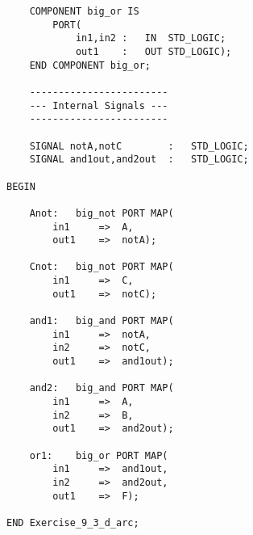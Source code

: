 \begin{enumerate}
\begin{lstlisting}
	COMPONENT big_or IS
		PORT(
			in1,in2	:	IN	STD_LOGIC;
			out1	:	OUT	STD_LOGIC);
	END COMPONENT big_or;
	
	------------------------
	--- Internal Signals ---
	------------------------
	
	SIGNAL notA,notC		:	STD_LOGIC;
	SIGNAL and1out,and2out	:	STD_LOGIC;
	
BEGIN
		
	Anot:	big_not PORT MAP(
		in1		=>	A,
		out1	=>	notA);
	
	Cnot:	big_not PORT MAP(
		in1		=>	C,
		out1	=>	notC);
		
	and1:	big_and PORT MAP(
		in1		=>	notA,
		in2		=>	notC,
		out1	=>	and1out);
		
	and2:	big_and PORT MAP(
		in1		=>	A,
		in2		=>	B,
		out1	=>	and2out);
		
	or1:	big_or PORT MAP(
		in1		=>	and1out,
		in2		=>	and2out,
		out1	=>	F);
	
END Exercise_9_3_d_arc;
\end{lstlisting}
\end{enumerate}

